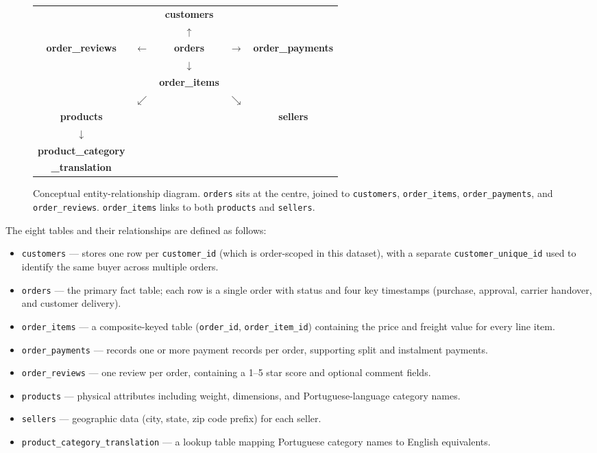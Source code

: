 \documentclass[12pt,a4paper]{article}
\begin{document}
\begin{figure}[H]
\centering
\ttfamily\small
\begin{tabular}{ccccc}
 & & \textbf{customers} & & \\
 & & $\uparrow$ & & \\
\textbf{order\_reviews} & $\leftarrow$ & \textbf{orders} & $\rightarrow$ & \textbf{order\_payments} \\
 & & $\downarrow$ & & \\
 & & \textbf{order\_items} & & \\
 & $\swarrow$ & & $\searrow$ & \\
\textbf{products} & & & & \textbf{sellers} \\
$\downarrow$ & & & & \\
\textbf{product\_category} & & & & \\
\textbf{\_translation} & & & & \\
\end{tabular}
\rmfamily
\caption{Conceptual entity-relationship diagram. \texttt{orders} sits at the centre,
    joined to \texttt{customers}, \texttt{order\_items}, \texttt{order\_payments}, and
    \texttt{order\_reviews}. \texttt{order\_items} links to both \texttt{products} and
    \texttt{sellers}.}
\label{fig:schema}
\end{figure}

The eight tables and their relationships are defined as follows:

\begin{itemize}
    \item \texttt{customers} — stores one row per \texttt{customer\_id} (which is
          order-scoped in this dataset), with a separate \texttt{customer\_unique\_id} used
          to identify the same buyer across multiple orders.
    \item \texttt{orders} — the primary fact table; each row is a single order with status
          and four key timestamps (purchase, approval, carrier handover, and customer delivery).
    \item \texttt{order\_items} — a composite-keyed table (\texttt{order\_id},
          \texttt{order\_item\_id}) containing the price and freight value for every line item.
    \item \texttt{order\_payments} — records one or more payment records per order,
          supporting split and instalment payments.
    \item \texttt{order\_reviews} — one review per order, containing a 1--5 star score and
          optional comment fields.
    \item \texttt{products} — physical attributes including weight, dimensions, and
          Portuguese-language category names.
    \item \texttt{sellers} — geographic data (city, state, zip code prefix) for each seller.
    \item \texttt{product\_category\_translation} — a lookup table mapping Portuguese
          category names to English equivalents.
\end{itemize}
\end{document}
